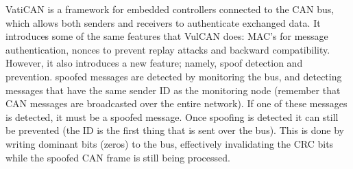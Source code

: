 VatiCAN is a framework for embedded controllers connected to the CAN bus, which allows both senders and receivers to authenticate exchanged data. It introduces some of the same features that VulCAN does: MAC's for message authentication, nonces to prevent replay attacks and backward compatibility. However, it also introduces a new feature; namely, spoof detection and prevention. spoofed messages are detected by monitoring the bus, and detecting messages that have the same sender ID as the monitoring node (remember that CAN messages are broadcasted over the entire network). If one of these messages is detected, it must be a spoofed message. Once spoofing is detected it can still be prevented (the ID is the first thing that is sent over the bus). This is done by writing dominant bits (zeros) to the bus, effectively invalidating the CRC bits while the spoofed CAN frame is still being processed. \cite{VatiCAN}

